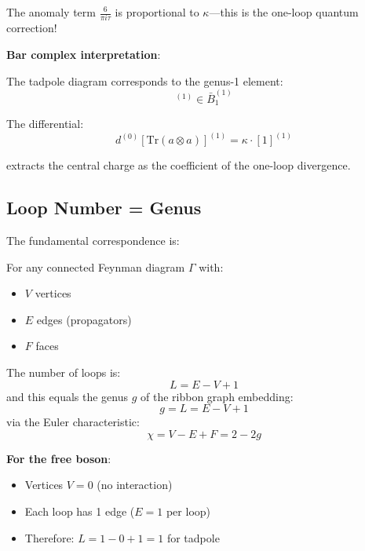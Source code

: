 The anomaly term $\frac{6}{\pi i \tau}$ is proportional to $\kappa$---this is the one-loop quantum correction!

\textbf{Bar complex interpretation}:

The tadpole diagram corresponds to the genus-1 element:
\begin{equation}
[\text{Tr}(a \otimes a)]^{(1)} \in \bar{B}^{(1)}_1
\end{equation}

The differential:
\begin{equation}
d^{(0)}[\text{Tr}(a \otimes a)]^{(1)} = \kappa \cdot [1]^{(1)}
\end{equation}

extracts the central charge as the coefficient of the one-loop divergence.

\subsection{Loop Number = Genus}

The fundamental correspondence is:

\begin{theorem}
For any connected Feynman diagram $\Gamma$ with:
\begin{itemize}
\item $V$ vertices
\item $E$ edges (propagators)
\item $F$ faces
\end{itemize}
The number of loops is:
\begin{equation}
L = E - V + 1
\end{equation}
and this equals the genus $g$ of the ribbon graph embedding:
\begin{equation}
g = L = E - V + 1
\end{equation}
via the Euler characteristic:
\begin{equation}
\chi = V - E + F = 2 - 2g
\end{equation}
\end{theorem}

\textbf{For the free boson}:
\begin{itemize}
\item Vertices $V = 0$ (no interaction)
\item Each loop has 1 edge ($E = 1$ per loop)
\item Therefore: $L = 1 - 0 + 1 = 1$ for tadpole
\end{itemize}

